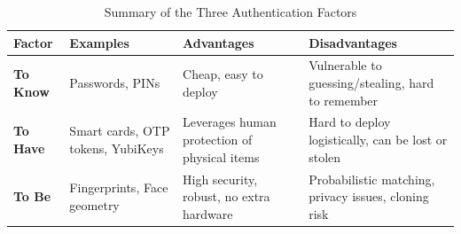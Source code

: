 \begin{table}[h!]
    \centering
    \renewcommand{\arraystretch}{1.2}
    \begin{tabular}{|l|p{3.5cm}|p{4.2cm}|p{4.2cm}|}
        \hline
        \textbf{Factor} & \textbf{Examples} & \textbf{Advantages} & \textbf{Disadvantages} \\ \hline
        \textbf{To Know} & Passwords, PINs & Cheap, easy to deploy & Vulnerable to guessing/stealing, hard to remember \\ \hline
        \textbf{To Have} & Smart cards, OTP tokens, YubiKeys & Leverages human protection of physical items & Hard to deploy logistically, can be lost or stolen \\ \hline
        \textbf{To Be} & Fingerprints, Face geometry & High security, robust, no extra hardware & Probabilistic matching, privacy issues, cloning risk \\ \hline
    \end{tabular}
    \caption{Summary of the Three Authentication Factors}
    \label{tab:auth_factors}
\end{table}
